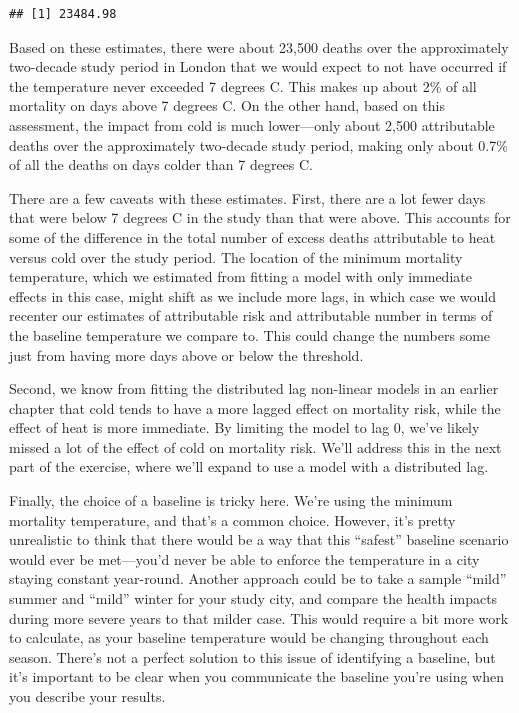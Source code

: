 \documentclass[
]{book}
\begin{document}
\begin{verbatim}
## [1] 23484.98
\end{verbatim}

Based on these estimates, there were about 23,500 deaths over the approximately two-decade study period in London that we would expect to not have occurred if the temperature never exceeded 7 degrees C. This makes up about 2\% of all mortality on days above 7 degrees C. On the other hand, based on this assessment, the impact from cold is much lower---only about 2,500 attributable deaths over the approximately two-decade study period, making only about 0.7\% of all the deaths on days colder than 7 degrees C.

There are a few caveats with these estimates. First, there are a lot fewer days that were below 7 degrees C in the study than that were above. This accounts for some of the difference in the total number of excess deaths attributable to heat versus cold over the study period. The location of the minimum mortality temperature, which we estimated from fitting a model with only immediate effects in this case, might shift as we include more lags, in which case we would recenter our estimates of attributable risk and attributable number in terms of the baseline temperature we compare to. This could change the numbers some just from having more days above or below the threshold.

Second, we know from fitting the distributed lag non-linear models in an earlier chapter that cold tends to have a more lagged effect on mortality risk, while the effect of heat is more immediate. By limiting the model to lag 0, we've likely missed a lot of the effect of cold on mortality risk. We'll address this in the next part of the exercise, where we'll expand to use a model with a distributed lag.

Finally, the choice of a baseline is tricky here. We're using the minimum mortality temperature, and that's a common choice. However, it's pretty unrealistic to think that there would be a way that this ``safest'' baseline scenario would ever be met---you'd never be able to enforce the temperature in a city staying constant year-round. Another approach could be to take a sample ``mild'' summer and ``mild'' winter for your study city, and compare the health impacts during more severe years to that milder case. This would require a bit more work to calculate, as your baseline temperature would be changing throughout each season. There's not a perfect solution to this issue of identifying a baseline, but it's important to be clear when you communicate the baseline you're using when you describe your results.
\end{document}
